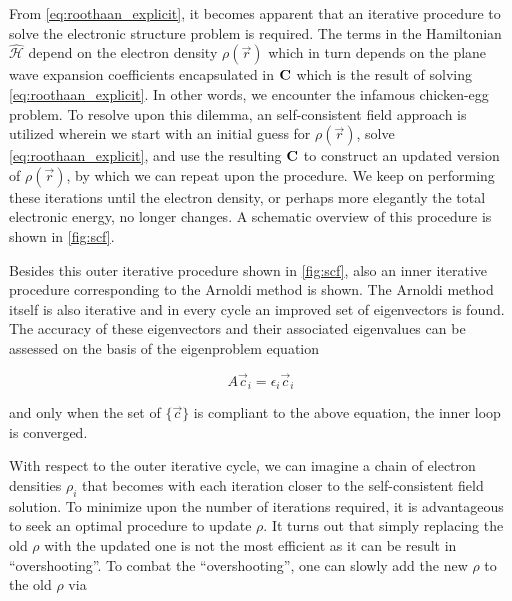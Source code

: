 \begin{Figure}
    \centering
    \resizebox{0.9 \textwidth}{!}{
        
    }
    \label{fig:scf}
\end{Figure}

From \cref{eq:roothaan_explicit}, it becomes apparent that an iterative procedure to solve the electronic structure problem is required. The terms in the Hamiltonian $\hat{\mathcal{H}}$ depend on the electron density $\rho(\vec{r})$ which in turn depends on the plane wave expansion coefficients encapsulated in $\mathbf{C}$ which is the result of solving \cref{eq:roothaan_explicit}. In other words, we encounter the infamous chicken-egg problem. To resolve upon this dilemma, an self-consistent field approach is utilized wherein we start with an initial guess for $\rho(\vec{r})$, solve \cref{eq:roothaan_explicit}, and use the resulting $\mathbf{C}$ to construct an updated version of $\rho(\vec{r})$, by which we can repeat upon the procedure. We keep on performing these iterations until the electron density, or perhaps more elegantly the total electronic energy, no longer changes. A schematic overview of this procedure is shown in \cref{fig:scf}.

Besides this outer iterative procedure shown in \cref{fig:scf}, also an inner iterative procedure corresponding to the Arnoldi method is shown. The Arnoldi method itself is also iterative and in every cycle an improved set of eigenvectors is found. The accuracy of these eigenvectors and their associated eigenvalues can be assessed on the basis of the eigenproblem equation

\begin{equation}
    A \vec{c}_{i} = \epsilon_{i} \vec{c}_{i}
\end{equation}

and only when the set of $\{ \vec{c} \}$ is compliant to the above equation, the inner loop is converged.

With respect to the outer iterative cycle, we can imagine a chain of electron densities $\rho_{i}$ that becomes with each iteration closer to the self-consistent field solution. To minimize upon the number of iterations required, it is advantageous to seek an optimal procedure to update $\rho$. It turns out that simply replacing the old $\rho$ with the updated one is not the most efficient as it can be result in ``overshooting''. To combat the ``overshooting'', one can slowly add the new $\rho$ to the old $\rho$ via

